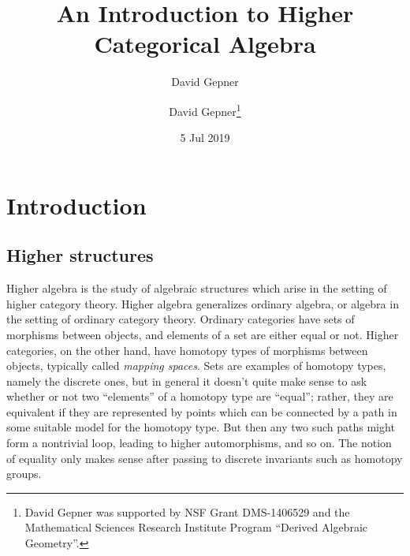 \documentclass[12pt]{article}
\date{5 Jul 2019}
\title{An Introduction to Higher Categorical Algebra}
\author{David Gepner}
\author{David Gepner\thanks{David Gepner was supported by NSF Grant DMS-1406529 and the Mathematical Sciences Research Institute Program ``Derived Algebraic Geometry''.}}
\theoremstyle{definition}
\begin{document}
\maketitle
\newpage

\tableofcontents
\newpage


%






\section{Introduction}\label{sec:it}



\subsection{Higher structures}

Higher algebra is the study of algebraic structures which arise in the setting of higher category theory.
Higher algebra generalizes ordinary algebra, or algebra in the setting of ordinary category theory.
Ordinary categories have sets of morphisms between objects, and elements of a set are either equal or not.
Higher categories, on the other hand, have homotopy types of morphisms between objects, typically called {\em mapping spaces}. Sets are examples of homotopy types, namely the discrete ones, but in general it doesn't quite make sense to ask whether or not two ``elements'' of a homotopy type are ``equal''; rather, they are equivalent if they are represented by points which can be connected by a path in some suitable model for the homotopy type. But then any two such paths might form a nontrivial loop, leading to higher automorphisms, and so on.
The notion of equality only makes sense after passing to discrete invariants such as homotopy groups.
\end{document}

